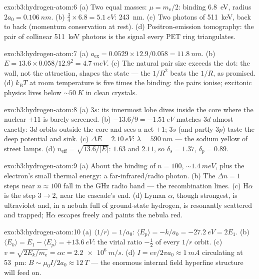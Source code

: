 \begin{solution}{exo:b3:hydrogen-atom:6}
(a) Two equal masses: $\mu = m_{\text{e}}/2$: binding
\qty{6.8}{eV}, radius $2a_0 = \qty{0.106}{nm}$. (b) $\tfrac34
\times 6.8 = \qty{5.1}{eV}$: \qty{243}{nm}. (c) Two photons of
\qty{511}{keV}, back to back (momentum conservation at rest). (d)
Positron-emission tomography: the pair of collinear
\qty{511}{keV} photons is the signal every PET ring triangulates.
\end{solution}

\begin{solution}{exo:b3:hydrogen-atom:7}
(a) $a_{\text{ex}} = 0.0529 \times 12.9/0.058 = \qty{11.8}{nm}$.
(b) $E = 13.6 \times 0.058/12.9^2 = \qty{4.7}{meV}$. (c) The
natural pair size exceeds the dot: the wall, not the attraction,
shapes the state --- the $1/R^2$ beats the $1/R$, as promised. (d)
$k_{\text{B}}T$ at room temperature is five times the binding: the
pairs ionise; excitonic physics lives below $\sim\qty{50}{K}$ in
clean crystals.
\end{solution}

\begin{solution}{exo:b3:hydrogen-atom:8}
(a) $3s$: its innermost lobe dives inside the core where the
nuclear $+11$ is barely screened. (b) $-13.6/9 = \qty{-1.51}{eV}$
matches $3d$ almost exactly: $3d$ orbits outside the core and sees
a net $+1$; $3s$ (and partly $3p$) taste the deep potential and
sink. (c) $\Delta E = \qty{2.10}{eV}$: $\lambda = \qty{590}{nm}$
--- the sodium yellow of street lamps. (d) $n_{\text{eff}} =
\sqrt{13.6/|E|}$: $1.63$ and $2.11$, so $\delta_s = 1.37$,
$\delta_p = 0.89$.
\end{solution}

\begin{solution}{exo:b3:hydrogen-atom:9}
(a) About the binding of $n = 100$, $\sim\qty{1.4}{meV}$, plus the
electron's small thermal energy: a far-infrared/radio photon. (b)
The $\Delta n = 1$ steps near $n \approx 100$ fall in the GHz radio
band --- the recombination lines. (c) H$\alpha$ is the step $3 \to
2$, near the cascade's end. (d) Lyman $\alpha$, though strongest,
is ultraviolet and, in a nebula full of ground-state hydrogen, is
resonantly scattered and trapped; H$\alpha$ escapes freely and
paints the nebula red.
\end{solution}

\begin{solution}{exo:b3:hydrogen-atom:10}
(a) $\langle 1/r\rangle = 1/a_0$: $\langle E_p\rangle = -k/a_0 =
\qty{-27.2}{eV} = 2E_1$. (b) $\langle E_k\rangle = E_1 - \langle
E_p\rangle = +\qty{13.6}{eV}$: the virial ratio $-\tfrac12$ of
every $1/r$ orbit. (c) $v = \sqrt{2E_k/m_{\text{e}}} = \alpha c =
\qty{2.2e6}{m/s}$. (d) $I = ev/2\pi a_0 \approx \qty{1}{mA}$
circulating at \qty{53}{pm}: $B \sim \mu_0I/2a_0 \approx
\qty{12}{T}$ --- the enormous internal field hyperfine structure
will feed on.
\end{solution}


